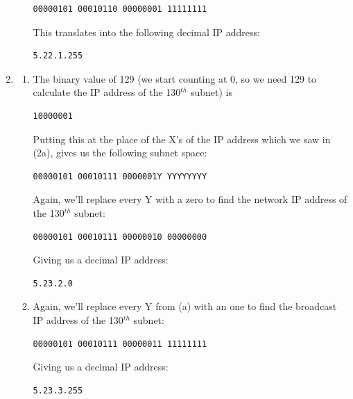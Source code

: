 \documentclass[12pt]{article}
\begin{document}
\begin{enumerate}
\begin{enumerate}
            \begin{verbatim}00000101 00010110 00000001 11111111\end{verbatim}
            This translates into the following decimal IP address:
            \begin{verbatim}5.22.1.255\end{verbatim}
    \end{enumerate}
    \item \begin{enumerate}
        \item The binary value of 129 (we start counting at 0, so we need 129
            to calculate the IP address of the 130$^{th}$ subnet) is
            \begin{verbatim}10000001\end{verbatim}
            Putting this at the place of the X's of the IP address which
            we saw in (2a), gives us the following subnet space:
            \begin{verbatim}00000101 00010111 0000001Y YYYYYYYY\end{verbatim}
            Again, we'll replace every Y with a zero to find the network
            IP address of the 130$^{th}$ subnet:
            \begin{verbatim}00000101 00010111 00000010 00000000\end{verbatim}
            Giving us a decimal IP address:
            \begin{verbatim}5.23.2.0\end{verbatim}
        \item Again, we'll replace every Y from (a) with an one to find
            the broadcast IP address of the 130$^{th}$ subnet:
            \begin{verbatim}00000101 00010111 00000011 11111111\end{verbatim}
            Giving us a decimal IP address:
            \begin{verbatim}5.23.3.255\end{verbatim}
    \end{enumerate}
\end{enumerate}
\clearpage
\end{document}
